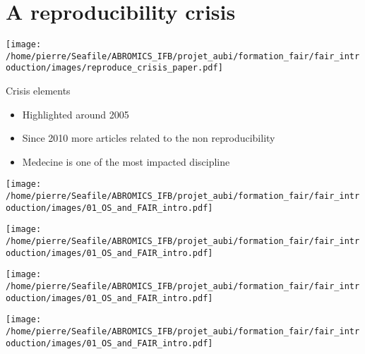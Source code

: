 \section{A reproducibility crisis}
\begin{frame}
\centering\texttt{[image: /home/pierre/Seafile/ABROMICS\_IFB/projet\_aubi/formation\_fair/fair\_introduction/images/reproduce\_crisis\_paper.pdf]}
\end{frame}

\begin{frame}
\begin{block}{Crisis elements}
\begin{itemize}
\item Highlighted around 2005
\item Since 2010 more articles related to the non reproducibility
\item Medecine is one of the most impacted discipline
\end{itemize}
\end{block}
\end{frame}


\begin{frame}
\texttt{[image: /home/pierre/Seafile/ABROMICS\_IFB/projet\_aubi/formation\_fair/fair\_introduction/images/01\_OS\_and\_FAIR\_intro.pdf]}
\end{frame}

\begin{frame}
\texttt{[image: /home/pierre/Seafile/ABROMICS\_IFB/projet\_aubi/formation\_fair/fair\_introduction/images/01\_OS\_and\_FAIR\_intro.pdf]}
\end{frame}

\begin{frame}
\texttt{[image: /home/pierre/Seafile/ABROMICS\_IFB/projet\_aubi/formation\_fair/fair\_introduction/images/01\_OS\_and\_FAIR\_intro.pdf]}
\end{frame}

\begin{frame}
\texttt{[image: /home/pierre/Seafile/ABROMICS\_IFB/projet\_aubi/formation\_fair/fair\_introduction/images/01\_OS\_and\_FAIR\_intro.pdf]}
\end{frame}


